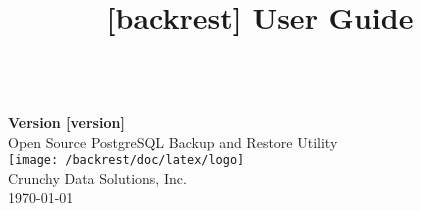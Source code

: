 \documentclass[letterpaper,12pt]{article}
\begin{document}
\title{{[backrest]} User Guide}


\makeatletter
    \begin{titlepage}
        \begin{center}
            {\huge \bfseries \@title}\\[1ex]
            {\large \bfseries Version {[version]}}\\[4ex]
            {\large Open Source PostgreSQL Backup and Restore Utility}\\[12ex]
            \texttt{[image: /backrest/doc/latex/logo]}\\[12ex]
            {\large Crunchy Data Solutions, Inc.}\\[1ex]
            {\large \today}
        \end{center}
    \end{titlepage}
\makeatother
\thispagestyle{empty}
\newpage

\thispagestyle{plain}
\renewcommand\contentsname{Table of Contents}
\tableofcontents

\end{document}
